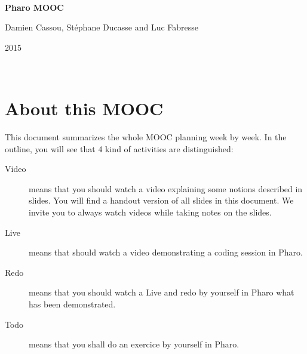 \documentclass[a4paper,11pt,final]{book}
\newenvironment{shadowblock}[1]%
{\begin{tcolorbox}[width=#1]}
{\end{tcolorbox}}
\begin{document}

\thispagestyle{empty}
\begin{center}
	\vspace*{1em}

	~\vfill %
	
	\begin{shadowblock}{\linewidth}
		\centering
		\begin{minipage}{\linewidth}
		\noindent\vspace*{1em}
		\begin{center}
		\textbf{\Huge Pharo MOOC}
		
		\vspace*{3.5em}
	
		{\LARGE Damien Cassou, Stéphane Ducasse and Luc Fabresse}
      
      \vspace*{2em}
      
      2015\\  
      \vspace*{0.5em}
	\end{center}    
	 
      \vspace*{1em}
	\end{minipage}
	\end{shadowblock}
\end{center}

~\vfill %

\newpage

\chapter*{About this MOOC}

This document summarizes the whole MOOC planning week by week.
In the outline, you will see that 4 kind of activities are distinguished:

\begin{description}
\item[Video] means that you should watch a video explaining some notions described in slides.
You will find a handout version of all slides in this document. 
We invite you to always watch videos while taking notes on the slides.

\item[Live] means that should watch a video demonstrating a coding session in Pharo. 

\item[Redo] means that you should watch a Live and redo by yourself in Pharo what has been demonstrated.

\item[Todo] means that you shall do an exercice by yourself in Pharo.

\end{description}
\end{document}
